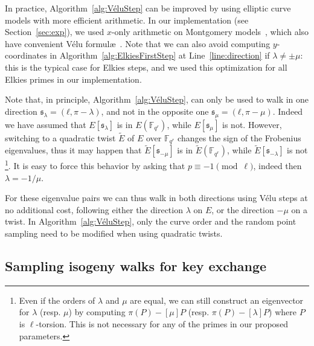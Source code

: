 \documentclass{llncs}
\newcommand{\F}{\mathbb{F}}
\renewcommand{\frak}{\mathfrak}
\begin{document}
In practice, Algorithm~\ref{alg:VéluStep} can be improved
by using elliptic curve models with more efficient arithmetic.
In our implementation (see Section~\ref{sec:exp}),
we used $x$-only arithmetic on Montgomery models~\cite{Montgomery87,CostelloSmith2017},
which also have convenient Vélu formul\ae~\cite{CostelloH17,Renes2018}.
Note that we can also avoid computing $y$-coordinates in
Algorithm~\ref{alg:ElkiesFirstStep}
at Line~\ref{line:direction} if $\lambda\neq\pm\mu$:
this is the typical case for Elkies steps, and we used this
optimization for all Elkies primes in our implementation.

\begin{remark}
    \label{rem:twist-trick}
    Note that, in principle, Algorithm~\ref{alg:VéluStep}, can only be
    used to walk in one direction $\frak s_λ=(ℓ,π-λ)$, and not in the
    opposite one $\frak s_μ=(ℓ,π-μ)$. Indeed we have assumed that
    $E[\frak s_λ]$ is in $E(\F_{q^r})$, while $E[\frak s_μ]$ is not.
    However, switching to a quadratic twist $\tilde{E}$ of $E$ over
    $\F_{q^r}$ changes the sign of the Frobenius eigenvalues, thus it
    may happen that $\tilde{E}[\frak s_{-μ}]$ is in
    $\tilde{E}(\F_{q^r})$, while $\tilde{E}[\frak s_{-λ}]$ is not \footnote{Even if the orders of $λ$ and $μ$ are equal, we can still construct an eigenvector for $λ$ (resp. $μ$) by computing $π(P) - [μ]P$ (resp. $π(P) - [λ]P$) where $P$ is $\ell$-torsion. This is not necessary for any of the primes in our proposed parameters.}. It
    is easy to force this behavior by asking that
    $p \equiv -1\pmod{\ell}$, indeed then $\lambda = -1/μ$.

    For these eigenvalue pairs we can thus walk in both directions
    using Vélu steps at no additional cost, following either the
    direction $λ$ on $E$, or the direction $-μ$ on a twist. In
    Algorithm~\ref{alg:VéluStep}, only the curve order and the random
    point sampling need to be modified when using quadratic twists.
\end{remark}

\subsection{Sampling isogeny walks for key exchange}
\end{document}
